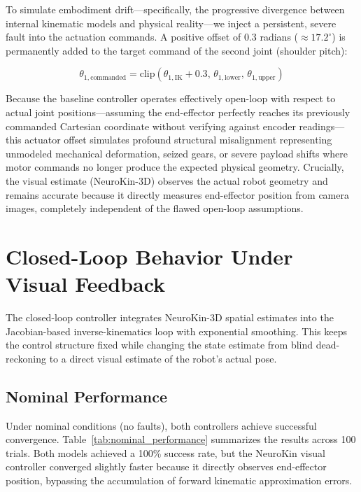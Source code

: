 \documentclass[12pt,a4paper,oneside]{report}
\begin{document}
To simulate embodiment drift—specifically, the progressive divergence between internal kinematic models and physical reality—we inject a persistent, severe fault into the actuation commands. A positive offset of 0.3 radians ($\approx 17.2^\circ$) is permanently added to the target command of the second joint (shoulder pitch):

\begin{equation}
\theta_{1,\text{commanded}} = \text{clip}(\theta_{1,\text{IK}} + 0.3, \, \theta_{1,\text{lower}}, \, \theta_{1,\text{upper}})
\end{equation}

Because the baseline controller operates effectively open-loop with respect to actual joint positions—assuming the end-effector perfectly reaches its previously commanded Cartesian coordinate without verifying against encoder readings—this actuator offset simulates profound structural misalignment representing unmodeled mechanical deformation, seized gears, or severe payload shifts where motor commands no longer produce the expected physical geometry. Crucially, the visual estimate (NeuroKin-3D) observes the actual robot geometry and remains accurate because it directly measures end-effector position from camera images, completely independent of the flawed open-loop assumptions.

\section{Closed-Loop Behavior Under Visual Feedback}

The closed-loop controller integrates NeuroKin-3D spatial estimates into the Jacobian-based inverse-kinematics loop with exponential smoothing. This keeps the control structure fixed while changing the state estimate from blind dead-reckoning to a direct visual estimate of the robot's actual pose.

\subsection{Nominal Performance}
\label{subsec:nominal_performance}

Under nominal conditions (no faults), both controllers achieve successful convergence. Table~\ref{tab:nominal_performance} summarizes the results across 100 trials. Both models achieved a 100\% success rate, but the NeuroKin visual controller converged slightly faster because it directly observes end-effector position, bypassing the accumulation of forward kinematic approximation errors.
\end{document}
